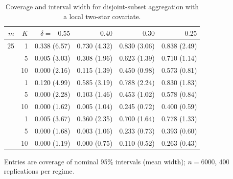 \begin{table}[tbp]
\centering
\small
\caption{Coverage and interval width for disjoint-subset aggregation with a local two-star covariate.}
\label{tab:disjoint-aggregation-two-star}
\begin{tabular}{@{}rrrrrr@{}}
\toprule
$m$ & $K$ & $\delta=-0.55$ & $-0.40$ & $-0.30$ & $-0.25$ \\
\midrule
25 & 1 & 0.338 (6.57) & 0.730 (4.32) & 0.830 (3.06) & 0.838 (2.49) \\
 & 5 & 0.005 (3.03) & 0.308 (1.96) & 0.623 (1.39) & 0.710 (1.14) \\
 & 10 & 0.000 (2.16) & 0.115 (1.39) & 0.450 (0.98) & 0.573 (0.81) \\
\addlinespace
50 & 1 & 0.120 (4.99) & 0.585 (3.19) & 0.788 (2.24) & 0.830 (1.83) \\
 & 5 & 0.000 (2.28) & 0.103 (1.46) & 0.453 (1.02) & 0.578 (0.84) \\
 & 10 & 0.000 (1.62) & 0.005 (1.04) & 0.245 (0.72) & 0.400 (0.59) \\
\addlinespace
100 & 1 & 0.005 (3.67) & 0.360 (2.35) & 0.700 (1.64) & 0.778 (1.33) \\
 & 5 & 0.000 (1.68) & 0.003 (1.06) & 0.233 (0.73) & 0.393 (0.60) \\
 & 10 & 0.000 (1.19) & 0.000 (0.75) & 0.110 (0.52) & 0.263 (0.43) \\
\bottomrule
\end{tabular}
\par\smallskip
{\footnotesize Entries are coverage of nominal 95\% intervals (mean width); $n=6000$, 400 replications per regime.}
\end{table}

